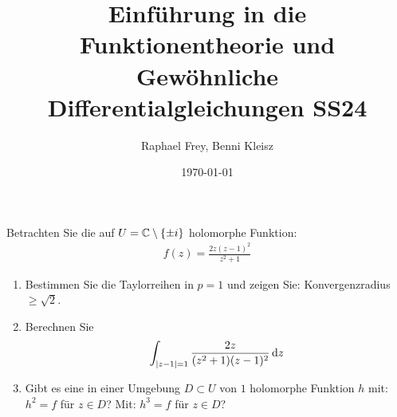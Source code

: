 \documentclass[ngerman]{report}
\title{Einführung in die Funktionentheorie und Gewöhnliche Differentialgleichungen SS24}
\author{Raphael Frey, Benni Kleisz}
\institute{Universität Tübingen}
\date{\today}
\begin{document}
\setcounter{question}{1}
\setcounter{answer}{1}
\begin{question}
    Betrachten Sie die auf $U = \mathbb{C}\setminus\{\pm i \}$ holomorphe Funktion:
    \begin{align*}
        f(z) = \frac{2z(z-1)^2}{z^2+1}
    \end{align*}
    \begin{enumerate}
        \item Bestimmen Sie die Taylorreihen in $p = 1$ und zeigen Sie: Konvergenzradius $\geq \sqrt{2}$.
        \item Berechnen Sie
        \begin{align*}
            \int_{\left|z-1\right|=1} \frac{2z}{(z^2+1)(z-1)^2}\dd{z}
        \end{align*}
        \item Gibt es eine in einer Umgebung $D \subset U$ von $1$ holomorphe Funktion $h$ mit: $h^2 = f$ für $z \in D$? Mit: $h^3=f$ für $z\in D$?
    \end{enumerate}
\end{question}
\end{document}
